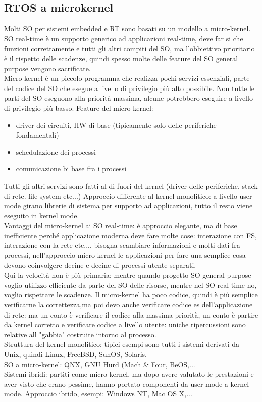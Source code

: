 \documentclass[12pt, oneside]{extbook}
\begin{document}
\subsection{RTOS a microkernel}
Molti SO per sistemi embedded e RT sono basati su un modello a micro-kernel. SO real-time è un supporto generico ad applicazioni real-time, deve far si che funzioni correttamente e tutti gli altri compiti del SO, ma l'obbiettivo prioritario è il rispetto delle scadenze, quindi spesso molte delle feature del SO general purpose vengono sacrificate.\\ Micro-kernel è un piccolo programma che realizza pochi servizi essenziali, parte del codice del SO che esegue a livello di privilegio più alto possibile. Non tutte le parti del SO eseguono alla priorità massima, alcune potrebbero eseguire a livello di privilegio più basso. Feature del micro-kernel:
\begin{itemize}
\item driver dei circuiti, HW di base (tipicamente solo delle periferiche fondamentali)
\item schedulazione dei processi
\item comunicazione bi base fra i processi
\end{itemize}
Tutti gli altri servizi sono fatti al di fuori del kernel (driver delle periferiche, stack di rete. file system etc...)
Approccio differente al kernel monolitico: a livello user mode girano librerie di sistema per supporto ad applicazioni, tutto il resto viene eseguito in kernel mode.\\ Vantaggi del micro-kernel ai SO real-time: è approccio elegante, ma di base inefficiente perché applicazione moderna deve fare molte cose: interazione con FS, interazione con la rete etc..., bisogna scambiare informazioni e molti dati fra processi, nell'approccio micro-kernel le applicazioni per fare una semplice cosa devono coinvolgere decine e decine di processi utente separati.\\ Qui la velocità non è più primaria: mentre quando progetto SO general purpose voglio utilizzo efficiente da parte del SO delle risorse, mentre nel SO real-time no, voglio rispettare le scadenze. Il micro-kernel ha poco codice, quindi è più semplice verificarne la correttezza,ma poi devo anche verificare codice es dell'applicazione di rete: ma un conto è verificare il codice alla massima priorità, un conto è partire da kernel corretto e verificare codice a livello utente: uniche ripercussioni sono relative all "gabbia" costruite intorno al processo.\\ Struttura del kernel monolitico: tipici esempi sono tutti i sistemi derivati da Unix, quindi Linux, FreeBSD, SunOS, Solaris.\\ SO a micro-kernel: QNX, GNU Hurd (Mach \& Four, BeOS,...\\ Sistemi ibridi: partiti come micro-kernel, ma dopo avere valutato le prestazioni e aver visto che erano pessime, hanno portato componenti da user mode a kernel mode. Approccio ibrido, esempi: Windows NT, Mac OS X,...
\end{document}
